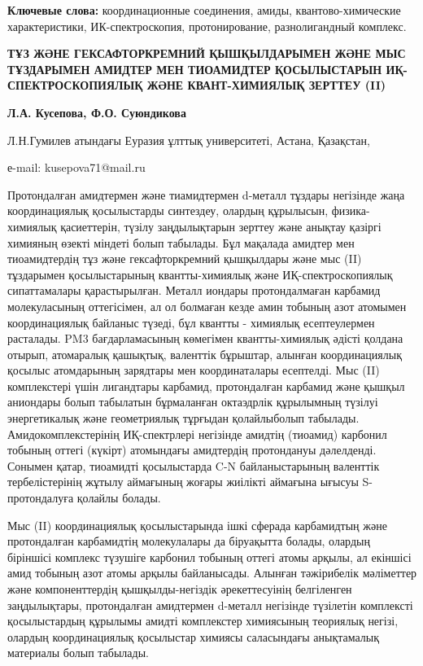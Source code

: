 {\bfseries Ключевые слова:} координационные соединения, амиды,
квантово-химические характеристики, ИК-спектроскопия, протонирование,
разнолигандный комплекс.

\begin{center}
{\large\bfseries ТҰЗ ЖӘНЕ ГЕКСАФТОРКРЕМНИЙ ҚЫШҚЫЛДАРЫМЕН ЖӘНЕ МЫС ТҰЗДАРЫМЕН
АМИДТЕР МЕН ТИОАМИДТЕР ҚОСЫЛЫСТАРЫН ИҚ-СПЕКТРОСКОПИЯЛЫҚ ЖӘНЕ
КВАНТ-ХИМИЯЛЫҚ ЗЕРТТЕУ (II)}

{\bfseries Л.А. Кусепова, Ф.О. Суюндикова}

Л.Н.Гумилев атындағы Еуразия ұлттық университеті, Астана, Қазақстан,

е-mail: kusepova71@mail.ru
\end{center}

Протондалған амидтермен және тиамидтермен d-металл тұздары негізінде
жаңа координациялық қосылыстарды синтездеу, олардың құрылысын,
физика-химиялық қасиеттерін, түзілу заңдылықтарын зерттеу және анықтау
қазіргі химияның өзекті міндеті болып табылады. Бұл мақалада амидтер мен
тиоамидтердің тұз және гексафторкремний қышқылдары және мыс (II)
тұздарымен қосылыстарының квантты-химиялық және ИҚ-спектроскопиялық
сипаттамалары қарастырылған. Металл иондары протондалмаған карбамид
молекуласының оттегісімен, ал ол болмаған кезде амин тобының азот
атомымен координациялық байланыс түзеді, бұл квантты - химиялық
есептеулермен расталады. PM3 бағдарламасының көмегімен квантты-химиялық
әдісті қолдана отырып, атомаралық қашықтық, валенттік бұрыштар, алынған
координациялық қосылыс атомдарының зарядтары мен координаталары
есептелді. Мыс (II) комплекстері үшін лигандтары карбамид, протондалған
карбамид және қышқыл аниондары болып табылатын бұрмаланған октаэдрлік
құрылымның түзілуі энергетикалық және геометриялық тұрғыдан қолайлыболып
табылады. Амидокомплекстерінің ИҚ-спектрлері негізінде амидтің (тиоамид)
карбонил тобының оттегі (күкірт) атомындағы амидтердің протондануы
дәлелденді. Сонымен қатар, тиоамидті қосылыстарда C-N байланыстарының
валенттік тербелістерінің жұтылу аймағының жоғары жиілікті аймағына
ығысуы S-протондалуға қолайлы болады.

Мыс (II) координациялық қосылыстарында ішкі сферада карбамидтың және
протондалған карбамидтің молекулалары да біруақытта болады, олардың
біріншісі комплекс түзушіге карбонил тобының оттегі атомы арқылы, ал
екіншісі амид тобының азот атомы арқылы байланысады. Алынған тәжірибелік
мәліметтер және компоненттердің қышқылды-негіздік әрекеттесуінің
белгіленген заңдылықтары, протондалған амидтермен d-металл негізінде
түзілетін комплексті қосылыстардың құрылымы амидті комплекстер
химиясының теориялық негізі, олардың координациялық қосылыстар химиясы
саласындағы анықтамалық материалы болып табылады.

